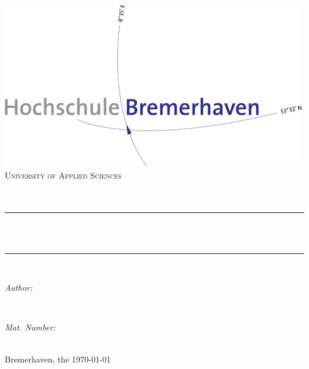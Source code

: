 \begin{titlepage} %
	\centering %
    
    \includegraphics[scale = 0.4]{images/hs-logo.png}\\[1.5 cm]	%
    \textsc{\LARGE University of Applied Sciences}\\[2.0 cm]%
	\textsc{\Large \sFaculty}\\[0.5 cm]				%
	\textsc{\large \sFirstTutor}\\[0.5 cm] %
    	
	\rule{\linewidth}{0.2 mm} \\[0.4 cm] %
	{ \huge \bfseries {\sTitle}}\\
	\rule{\linewidth}{0.2 mm} \\[1.5 cm] %
	
	\begin{minipage}{0.5\textwidth} %
		\begin{center} \large %
			\emph{Author:}\\
			\makeatletter\@author\makeatother
			\end{center}
			\end{minipage}~
			\begin{minipage}{0.5\textwidth}
			\begin{center} \large %
			\emph{Mat. Number:} \\
            \sMtrNr								
		\end{center}
	\end{minipage}\\[1.5 cm] %
	
	{ \large Bremerhaven, the \today} %
    
\end{titlepage}
